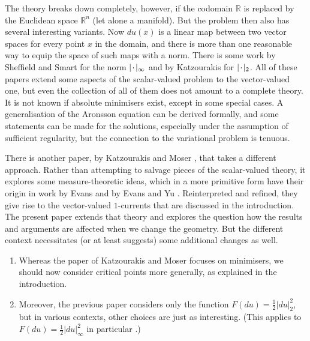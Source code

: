 \documentclass[a4paper]{article}
\newcommand{\R}{\mathbb{R}}
\newcommand{\blank}{{\mkern 2mu\cdot\mkern 2mu}}
\theoremstyle{definition}
\theoremstyle{remark}
\begin{document}
The theory breaks down completely, however, if the codomain $\R$ is replaced
by the Euclidean space $\R^n$ (let alone a manifold). But the problem then also
has several interesting variants. Now $du(x)$ is a linear map between two
vector spaces for every point $x$ in the domain, and there is more than one reasonable way to
equip the space of such maps with a norm. There is some work by
Sheffield and Smart \cite{Sheffield-Smart:12} for the norm $|\blank|_\infty$
and by Katzourakis \cite{Katzourakis:12, Katzourakis:13, Katzourakis:14.1, Katzourakis:14.2, Katzourakis:15.2, Katzourakis:17.1} for $|\blank|_2$.
All of these papers extend some aspects of the
scalar-valued problem to the vector-valued one, but even the collection of
all of them does not amount to a complete theory. It is not known if
absolute minimisers exist, except in some special cases. A generalisation of the Aronsson equation
can be derived formally, and some statements can be made for the solutions,
especially under the assumption of sufficient regularity, but the connection
to the variational problem is tenuous.

There is another paper, by Katzourakis and Moser \cite{Katzourakis-Moser:25},
that takes a different approach. Rather than attempting to salvage pieces
of the scalar-valued theory, it explores some measure-theoretic ideas, which in a
more primitive form have their origin in work by Evans \cite{Evans:03.2} and by
Evans and Yu \cite{Evans-Yu:05}. Reinterpreted and refined, they give rise
to the vector-valued $1$-currents that are discussed in the introduction.
The present paper extends that theory and explores the question how the results and arguments
are affected when we change the geometry. But the different context necessitates (or at least
suggests) some additional changes as well.
\begin{enumerate}
\item \label{itm:critical-points}
Whereas the paper of Katzourakis and Moser focuses on minimisers, we should now consider critical points more generally,
as explained in the introduction.
\item \label{itm:general-functions}
Moreover, the previous paper considers only the
function $F(du) = \frac{1}{2} |du|_2^2$, but in various contexts, other choices are
just as interesting. (This applies to $F(du) = \frac{1}{2} |du|_\infty^2$
in particular
\cite{Sheffield-Smart:12, Daskalopoulos-Uhlenbeck:24, Daskalopoulos-Uhlenbeck:22, Daskalopoulos-Uhlenbeck:24.2}.)
\end{enumerate}
\end{document}
